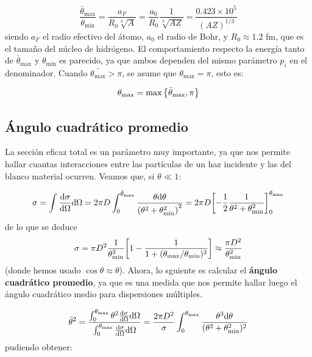 \begin{equation}
    \frac{\bar{\theta}_{\max}}{\theta_{\min}} = \frac{a_F}{R_0 \sqrt[3]{A}} = \frac{a_0}{R_0} \frac{1}{\sqrt[3]{AZ}}  =  \frac{0.423 \times 10^5}{(AZ)^{1/3}} \label{Ec:02-CocienteDeAngulos}
\end{equation}
siendo $a_F$ el radio efectivo del átomo, $a_0$ el radio de Bohr,  y $R_0 \approx 1.2$ fm, que es el tamaño del núcleo de hidrógeno. El comportamiento respecto la energía tanto de $\bar{\theta}_{\max}$ y $\theta_{\min}$ es parecido, ya que ambos dependen del mismo parámetro $p_i$ en el denominador.
Cuando $\bar{\theta_{\max}}>\pi$, se asume que $\theta_{\max} = \pi$, esto es: 

\begin{equation}
    \theta_{\max} = \max \Bqty{\bar{\theta}_{\max}, \pi}
\end{equation}

\subsection{Ángulo cuadrático promedio}

La sección eficaz total es un parámetro muy importante, ya que nos permite hallar cuantas interacciones entre las partículas de un haz incidente y las del blanco material ocurren. Veamos que, si $\theta \ll 1$: 

\begin{equation*}
    \sigma = \int \dv{\sigma}{\Omega} \D \Omega = 2 \pi D \int_0^{\bar{\theta}_{\max}} \frac{\theta   \D \theta}{\pqty{\theta^2 + \theta_{\min}^2}^2} =  2 \pi D \bqty{-\frac{1}{2} \frac{1}{\theta^2 + \theta_{\min}^2}}_{0}^{\theta_{\max}}
\end{equation*}
de lo que se deduce 
\begin{equation}
    \sigma =\pi D^2 \frac{1}{\theta^2_{\min}} \bqty{1-\frac{1}{1+(\theta_{\max}/\theta_{\min})^2}} \approx \frac{\pi D^2}{\theta_{\min}^2}
\end{equation}
(donde hemos usado $\cos \theta \approx \theta$). Ahora, lo sguiente es calcular el \textbf{ángulo cuadrático promedio}, ya que es una medida que nos permite hallar luego el ángulo cuadrático medio para dispersiones múltiples. 

\begin{equation}
    \bar{\theta}^2 = \frac{\int_{0}^{\theta_{\max}} \theta^2  \dv{\sigma}{\Omega} \mathrm{d} \Omega}{\int_{0}^{\theta_{\max}} \dv{\sigma}{\Omega} \mathrm{d} \Omega} = \frac{2\pi D^2}{\sigma} \int_{0}^{\theta_{\max}} \frac{\theta^3 \mathrm{d} \theta}{(\theta^2 + \theta_{\min}^2)^2}
\end{equation}
pudiendo obtener:

